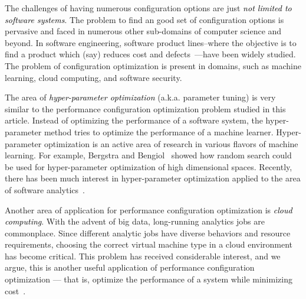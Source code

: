 \documentclass[10pt,journal,compsoc]{IEEEtran}
\begin{document}
 
 
The challenges of having numerous configuration options are just \textcolor{black}{{\em not limited to software systems}}. The problem to find an good set of configuration options is pervasive and faced in numerous other sub-domains of computer science and beyond. In software engineering, software product lines--where the objective is to find a product which (say) reduces cost and defects~\cite{chen2016sampling, henard2015combining}---have been widely studied.  
The problem of configuration optimization is present in domains, such as machine learning, cloud computing, and software security.


The area of \textcolor{black}{{\em hyper-parameter optimization}} (a.k.a.  parameter tuning) is very similar to the performance configuration optimization problem studied in this article. Instead of optimizing the performance of a software system, the hyper-parameter method tries to optimize the performance of a machine learner. Hyper-parameter optimization is an active area of research in various flavors of machine learning. For example, Bergstra and Bengiol~\cite{bergstra2013making} showed how random search could be used for hyper-parameter optimization of high dimensional spaces.
Recently, there has been much interest in 
hyper-parameter optimization applied to the area of software analytics~\cite{fu2016tuning, fufse17, fu2016differential, tantithamthavorn2016automated, agrawal2016wrong}.

Another area of application for performance configuration optimization is \textcolor{black}{{\em cloud computing}}.  
With the advent of big data, long-running analytics jobs are commonplace. Since different analytic jobs have diverse behaviors and resource requirements, choosing the correct virtual machine type
in a  cloud environment has become critical. This problem has received considerable interest, and we argue, this is another useful application of performance configuration optimization --- that is, optimize the performance of a system while minimizing cost~\cite{alipourfard2017cherrypick, venkataraman2016ernest, yadwadkar2017selecting, Zhu:2017:BTP:3127479.3128605, dalibard2017boat}. 
\end{document}
